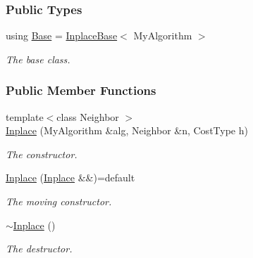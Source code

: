 \subsubsection*{Public Types}
\begin{DoxyCompactItemize}
\item 
using \hyperlink{structslb_1_1ext_1_1policy_1_1backtrackLock_1_1Inplace_a2668b070defebca51e8b0d420a90f68b}{Base} = \hyperlink{structslb_1_1ext_1_1policy_1_1backtrackLock_1_1InplaceBase}{Inplace\+Base}$<$ My\+Algorithm $>$\hypertarget{structslb_1_1ext_1_1policy_1_1backtrackLock_1_1Inplace_a2668b070defebca51e8b0d420a90f68b}{}\label{structslb_1_1ext_1_1policy_1_1backtrackLock_1_1Inplace_a2668b070defebca51e8b0d420a90f68b}

\begin{DoxyCompactList}\small\item\em The base class. \end{DoxyCompactList}\end{DoxyCompactItemize}
\subsubsection*{Public Member Functions}
\begin{DoxyCompactItemize}
\item 
{\footnotesize template$<$class Neighbor $>$ }\\\hyperlink{structslb_1_1ext_1_1policy_1_1backtrackLock_1_1Inplace_afde8d0b3b15952436e678b8ab265cbc1}{Inplace} (My\+Algorithm \&alg, Neighbor \&n, Cost\+Type h)
\begin{DoxyCompactList}\small\item\em The constructor. \end{DoxyCompactList}\item 
\hyperlink{structslb_1_1ext_1_1policy_1_1backtrackLock_1_1Inplace_aba500581c23a004f268e95a7865b6bf5}{Inplace} (\hyperlink{structslb_1_1ext_1_1policy_1_1backtrackLock_1_1Inplace}{Inplace} \&\&)=default\hypertarget{structslb_1_1ext_1_1policy_1_1backtrackLock_1_1Inplace_aba500581c23a004f268e95a7865b6bf5}{}\label{structslb_1_1ext_1_1policy_1_1backtrackLock_1_1Inplace_aba500581c23a004f268e95a7865b6bf5}

\begin{DoxyCompactList}\small\item\em The moving constructor. \end{DoxyCompactList}\item 
\hyperlink{structslb_1_1ext_1_1policy_1_1backtrackLock_1_1Inplace_ae63582d7aed48217b32c67c8fd69a1ec}{$\sim$\+Inplace} ()\hypertarget{structslb_1_1ext_1_1policy_1_1backtrackLock_1_1Inplace_ae63582d7aed48217b32c67c8fd69a1ec}{}\label{structslb_1_1ext_1_1policy_1_1backtrackLock_1_1Inplace_ae63582d7aed48217b32c67c8fd69a1ec}

\begin{DoxyCompactList}\small\item\em The destructor. \end{DoxyCompactList}\end{DoxyCompactItemize}
